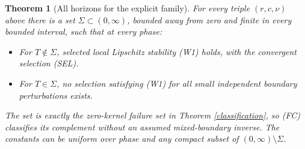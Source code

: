 \documentclass[11pt,a4paper]{article}
\newtheorem{theorem}{Theorem}
\begin{document}
\begin{theorem}[All horizons for the explicit family]\label{wave}
For every triple $(r,c,\nu)$ above there is a set
$\Sigma\subset(0,\infty)$, bounded away from zero and finite in every
bounded interval, such that at every phase:
\begin{itemize}
\item For $T\notin\Sigma$, selected local Lipschitz stability (W1)
holds, with the convergent selection (SEL).
\item For $T\in\Sigma$, no selection satisfying (W1) for all small
independent boundary perturbations exists.
\end{itemize}
The set is exactly the zero-kernel failure set in Theorem
\ref{classification}, so (FC) classifies its complement without an
assumed mixed-boundary inverse. The constants can be uniform over
phase and any compact subset of $(0,\infty)\setminus\Sigma$.
\end{theorem}
\end{document}
